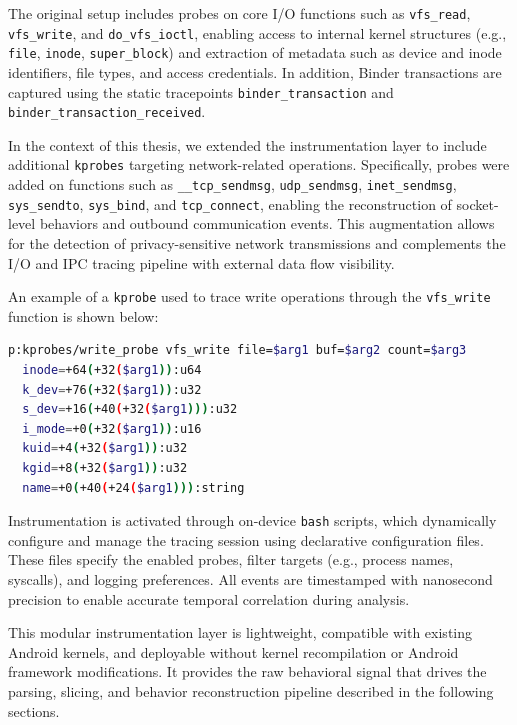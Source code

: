 \documentclass[a4paper,12pt]{report}
\begin{document}
The original setup includes probes on core I/O functions such as \texttt{vfs\_read}, \texttt{vfs\_write}, and \texttt{do\_vfs\_ioctl}, enabling access to internal kernel structures (e.g., \texttt{file}, \texttt{inode}, \texttt{super\_block}) and extraction of metadata such as device and inode identifiers, file types, and access credentials. In addition, Binder transactions are captured using the static tracepoints \texttt{binder\_transaction} and \texttt{binder\_transaction\_received}.

In the context of this thesis, we extended the instrumentation layer to include additional \texttt{kprobes} targeting network-related operations. Specifically, probes were added on functions such as \texttt{\_\_tcp\_sendmsg}, \texttt{udp\_sendmsg}, \texttt{inet\_sendmsg}, \texttt{sys\_sendto}, \texttt{sys\_bind}, and \texttt{tcp\_connect}, enabling the reconstruction of socket-level behaviors and outbound communication events. This augmentation allows for the detection of privacy-sensitive network transmissions and complements the I/O and IPC tracing pipeline with external data flow visibility.

An example of a \texttt{kprobe} used to trace write operations through the \texttt{vfs\_write} function is shown below:

\begin{lstlisting}[language=bash,caption={Example kprobe for vfs\_write in tracefs syntax}]
p:kprobes/write_probe vfs_write file=$arg1 buf=$arg2 count=$arg3
  inode=+64(+32($arg1)):u64
  k_dev=+76(+32($arg1)):u32
  s_dev=+16(+40(+32($arg1))):u32
  i_mode=+0(+32($arg1)):u16
  kuid=+4(+32($arg1)):u32
  kgid=+8(+32($arg1)):u32
  name=+0(+40(+24($arg1))):string
\end{lstlisting}

Instrumentation is activated through on-device \texttt{bash} scripts, which dynamically configure and manage the tracing session using declarative configuration files. These files specify the enabled probes, filter targets (e.g., process names, syscalls), and logging preferences. All events are timestamped with nanosecond precision to enable accurate temporal correlation during analysis.

This modular instrumentation layer is lightweight, compatible with existing Android kernels, and deployable without kernel recompilation or Android framework modifications. It provides the raw behavioral signal that drives the parsing, slicing, and behavior reconstruction pipeline described in the following sections.
\end{document}
